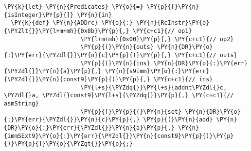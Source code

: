\begin{Verbatim}[commandchars=\\\{\}]
\PY{k}{let} \PY{n}{Predicates} \PY{o}{=} \PY{p}{[}\PY{n}{isInteger}\PY{p}{]} \PY{n}{in}
  \PY{k}{def} \PY{n}{ADDrc} \PY{o}{:} \PY{n}{RcInstr}\PY{o}{\PYZlt{}}\PY{l+m+mh}{0x8b}\PY{p}{,} \PY{c+c1}{// op1}
                      \PY{l+m+mh}{0x00}\PY{p}{,} \PY{c+c1}{// op2}
                      \PY{p}{(}\PY{n}{outs} \PY{n}{DR}\PY{o}{:}\PY{err}{\PYZdl{}}\PY{n}{c}\PY{p}{)}\PY{p}{,} \PY{c+c1}{// outs}
                      \PY{p}{(}\PY{n}{ins} \PY{n}{DR}\PY{o}{:}\PY{err}{\PYZdl{}}\PY{n}{a}\PY{p}{,} \PY{n}{s9imm}\PY{o}{:}\PY{err}{\PYZdl{}}\PY{n}{const9}\PY{p}{)}\PY{p}{,} \PY{c+c1}{// ins}
                      \PY{l+s}{\PYZdq{}}\PY{l+s}{addnt\PYZdl{}c, \PYZdl{}a, \PYZdl{}const9}\PY{l+s}{\PYZdq{}}\PY{p}{,} \PY{c+c1}{// asmString}
                      \PY{p}{[}\PY{p}{(}\PY{n}{set} \PY{n}{DR}\PY{o}{:}\PY{err}{\PYZdl{}}\PY{n}{c}\PY{p}{,} \PY{p}{(}\PY{n}{add} \PY{n}{DR}\PY{o}{:}\PY{err}{\PYZdl{}}\PY{n}{a}\PY{p}{,} \PY{n}{immSExt9}\PY{o}{:}\PY{err}{\PYZdl{}}\PY{n}{const9}\PY{p}{)}\PY{p}{)}\PY{p}{]}\PY{o}{\PYZgt{}}\PY{p}{;}
\end{Verbatim}
